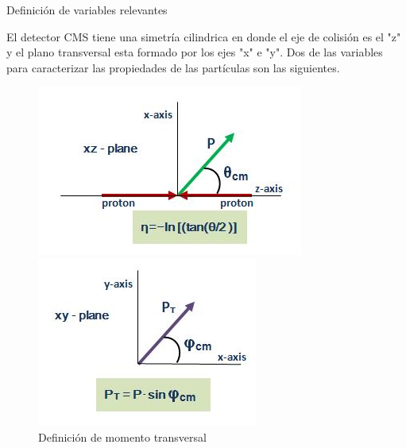 \begin{frame}{Definición de variables relevantes}

El detector CMS tiene una simetría cilindrica en donde el eje de colisi\'on es el "z" y el plano transversal esta formado por los ejes "x" e "y". Dos de las variables para caracterizar las propiedades de las partículas son las siguientes. 

    \begin{figure}[ht]
        \begin{minipage}[b]{0.45\linewidth}
            \centering
            \includegraphics[width=\textwidth]{pseudorapidity.PNG}
            \caption{Definición de pseudorapidez}
            \label{fig:a}
        \end{minipage}
        \hspace{0.5cm}
        \begin{minipage}[b]{0.45\linewidth}
            \centering
            \includegraphics[width=\textwidth]{pt.PNG}
            \caption{Definición de momento transversal}
            \label{fig:b}
        \end{minipage}
    \end{figure}
    
\end{frame}

